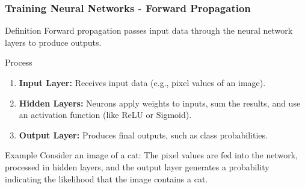\documentclass[aspectratio=169]{beamer}
\begin{document}
\begin{frame}[fragile]
    \frametitle{Training Neural Networks - Forward Propagation}
    \begin{block}{Definition}
        Forward propagation passes input data through the neural network layers to produce outputs.
    \end{block}
    
    \begin{block}{Process}
        \begin{enumerate}
            \item \textbf{Input Layer:} Receives input data (e.g., pixel values of an image).
            \item \textbf{Hidden Layers:} Neurons apply weights to inputs, sum the results, and use an activation function (like ReLU or Sigmoid).
            \item \textbf{Output Layer:} Produces final outputs, such as class probabilities.
        \end{enumerate}
    \end{block}

    \begin{block}{Example}
        Consider an image of a cat: The pixel values are fed into the network, processed in hidden layers, and the output layer generates a probability indicating the likelihood that the image contains a cat.
    \end{block}
\end{frame}
\end{document}
